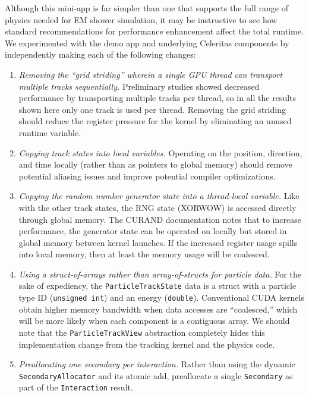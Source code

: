 \documentclass{webofc}
\begin{document}
Although this mini-app is far simpler than one that supports the full range of
physics needed for EM shower simulation, it may be instructive to see how
standard recommendations for performance enhancement affect the total runtime.
We experimented with the demo app and underlying Celeritas components by
independently making each of the following changes:
\begin{enumerate}[left=0pt, itemsep=0pt]
  \item \emph{Removing the ``grid striding'' wherein a single GPU thread can
    transport multiple tracks sequentially.} Preliminary studies showed
    decreased performance by transporting multiple tracks per thread, so in all
    the results shown here only one track is used per thread. Removing the grid
    striding should reduce the register pressure for the kernel by eliminating
    an unused runtime variable.
  \item \emph{Copying track states into local variables.} Operating on the
    position, direction, and time locally (rather than as pointers to global
    memory) should remove potential aliasing issues and improve potential
    compiler optimizations.
  \item \emph{Copying the random number generator state into a thread-local
    variable.}
    Like with the other track states, the RNG state (XORWOW) is accessed
    directly through global memory. The CURAND documentation notes
    that to increase performance, the generator state can be operated on locally
    but stored in global memory between kernel launches. If the increased
    register usage spills into local memory, then at least the memory usage will
    be coalesced.
  \item \emph{Using a struct-of-arrays rather than array-of-structs for particle
    data.} For the sake of expediency, the \texttt{ParticleTrackState} data is a
    struct with a particle type ID (\texttt{unsigned int}) and an energy
    (\texttt{double}). Conventional CUDA kernels obtain higher memory
    bandwidth when data accesses are ``coalesced,'' which will be more likely
    when each component is a contiguous array. We should note that the
    \texttt{ParticleTrackView} abstraction completely hides this implementation
    change from the tracking kernel and the physics code.
  \item \emph{Preallocating one secondary per interaction.} Rather than using
    the dynamic \texttt{SecondaryAllocator} and its atomic add, preallocate a
    single \texttt{Secondary} as part of the \texttt{Interaction} result.

\end{enumerate}
\end{document}
